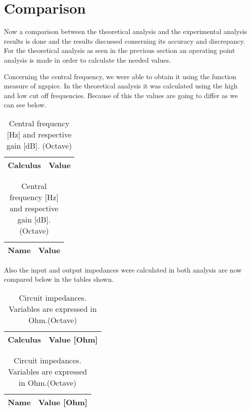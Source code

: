\section{Comparison}
\label{section:comparison}

\par Now a comparison between the theoretical analysis and the experimental analysis results is done and the results discussed conserning its accuracy and discrepancy. For the theoretical analysis as seen in the previous section an operating point analysis is made in order to calculate the needed values.
 
 \par Concerning the central frequency, we were able to obtain it using the function measure of ngspice. In the theoretical analysis it was calculated using the high and low cut off frequencies. Because of this the values are going to differ as we can see below.

 \begin{table}[H]
\parbox{.45\linewidth}{
  \centering
  \begin{tabular}{|l|r|}
    \hline    
    {\bf Calculus} & {\bf Value} \\ \hline
    
  \end{tabular}
  \caption{Central frequency [Hz] and respective gain [dB]. (Ngspice)}} 
\parbox{.45\linewidth}{
 \centering
  \begin{tabular}{|l|r|}
    \hline    
    {\bf Name} & {\bf Value} \\ \hline
    
  \end{tabular}
  \caption{Central frequency [Hz] and respective gain [dB]. (Octave)}}
\end{table}

\par Also the input and output impedances were calculated in both analysis are now compared below in the tables shown.

\begin{table}[H]
\parbox{.45\linewidth}{
  \centering
  \begin{tabular}{|l|r|}
    \hline    
    {\bf Calculus} & {\bf Value [Ohm]} \\ \hline
    
  \end{tabular}
  \caption{Circuit impedances. Variables are expressed in Ohm.(Ngspice)}} 
\parbox{.45\linewidth}{
 \centering
  \begin{tabular}{|l|r|}
    \hline    
    {\bf Name} & {\bf Value [Ohm]} \\ \hline
    
  \end{tabular}
  \caption{Circuit impedances. Variables are expressed in Ohm.(Octave)}}
\end{table}

